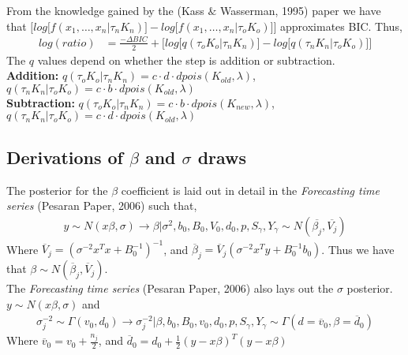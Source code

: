 \documentclass[submit]{smj}
\begin{document}
From the knowledge gained by the (Kass $\&$ Wasserman, 1995) paper we have that $\Big[ log \big[ f(x_1,\dots,x_n | \tau_{n} K_{n}) \big] -  log \big[ f(x_1,\dots,x_n | \tau_{o} K_{o})\big] \Big] $ approximates BIC. Thus,
\begin{align*}
log(ratio) &= \frac{- \Delta BIC}{2} + 
\Big[ log \big[ q(\tau_{o} K_{o} | \tau_{n} K_{n}) \big] - log \big[ q(\tau_{n} K_{n}| \tau_{o} K_{o})  \big] \Big]
\end{align*}
The $q$ values depend on whether the step is addition or subtraction. \\
\textbf{Addition:} 
$q(\tau_{o} K_{o} | \tau_{n} K_{n}) = c \cdot d \cdot dpois(K_{old} , \lambda)$, $q(\tau_{n} K_{n} | \tau_{o} K_{o}) = c \cdot b \cdot dpois(K_{old} , \lambda)$
\\
\textbf{Subtraction:}
$q(\tau_{o} K_{o} | \tau_{n} K_{n}) = c \cdot b \cdot dpois(K_{new} , \lambda)$, $q(\tau_{n} K_{n} | \tau_{o} K_{o}) = c \cdot d \cdot dpois(K_{old} , \lambda)$ \\


\subsection{Derivations of $\beta$ and $\sigma$ draws}

The posterior for the $\beta$ coefficient is laid out in detail in the \textit{Forecasting time series} (Pesaran Paper, 2006) such that, 
\begin{align*}
y \sim  N(x \beta , \sigma ) \longrightarrow \beta | \sigma^2, b_0, B_0, V_0, d_0, p , S_{\gamma}, Y_{\gamma} \sim N( \overline{\beta_j } , \overline{V_j} )
\end{align*}
Where $\overline{V}_j = (\sigma^{-2}x^Tx + B_0^{-1})^{-1}$, and $\overline{\beta}_j = \overline{V}_j(\sigma^{-2}x^Ty + B_0^{-1}b_0)$. Thus we have that $\beta  \sim N(\overline{\beta}_j, \overline{V}_j)$. \\

The \textit{Forecasting time series} (Pesaran Paper, 2006) also lays out the $\sigma$ posterior. $y \sim N(x \beta , \sigma )$ and 
\begin{align*}
\sigma_j^{-2} \sim  \Gamma(v_0, d_0) \longrightarrow \sigma^{-2}_j | \beta, b_0, B_0, v_0, d_0, p , S_{\gamma}, Y_{\gamma} \sim \Gamma (d = \overline{v}_0, \beta = \overline{d}_0) 
\end{align*} 
Where $\overline{v}_0 = v_0 + \frac{n_j}{2}$, and $\overline{d}_0 = d_0 + \frac{1}{2}(y-x\beta)^T(y-x\beta)$
\end{document}
